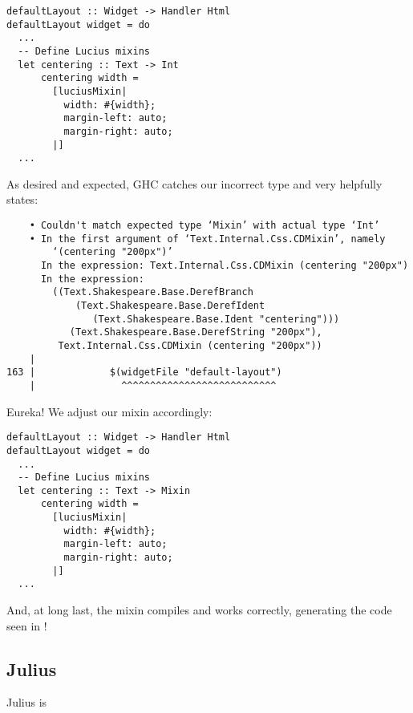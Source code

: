 \begin{Verbatim}
defaultLayout :: Widget -> Handler Html
defaultLayout widget = do
  ...
  -- Define Lucius mixins
  let centering :: Text -> Int
      centering width =
        [luciusMixin|
          width: #{width};
          margin-left: auto;
          margin-right: auto;
        |]
  ...
\end{Verbatim}

As desired and expected, GHC catches our incorrect type and very helpfully states:

\begin{Verbatim}
    • Couldn't match expected type ‘Mixin’ with actual type ‘Int’
    • In the first argument of ‘Text.Internal.Css.CDMixin’, namely
        ‘(centering "200px")’
      In the expression: Text.Internal.Css.CDMixin (centering "200px")
      In the expression:
        ((Text.Shakespeare.Base.DerefBranch
            (Text.Shakespeare.Base.DerefIdent
               (Text.Shakespeare.Base.Ident "centering")))
           (Text.Shakespeare.Base.DerefString "200px"), 
         Text.Internal.Css.CDMixin (centering "200px"))
    |
163 |             $(widgetFile "default-layout")
    |               ^^^^^^^^^^^^^^^^^^^^^^^^^^^
\end{Verbatim}

Eureka! We adjust our mixin accordingly:

\begin{Verbatim}
defaultLayout :: Widget -> Handler Html
defaultLayout widget = do
  ...
  -- Define Lucius mixins
  let centering :: Text -> Mixin
      centering width =
        [luciusMixin|
          width: #{width};
          margin-left: auto;
          margin-right: auto;
        |]
  ...
\end{Verbatim}

And, at long last, the mixin compiles and works correctly, generating the code seen in ! 

\subsection{Julius}

Julius is

